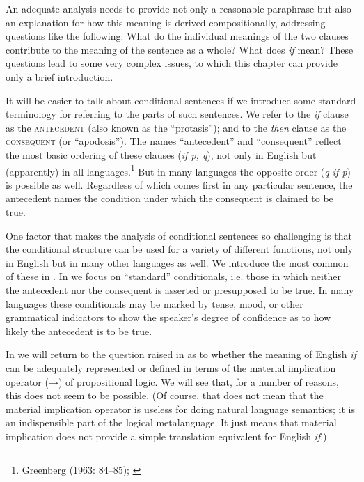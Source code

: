 An adequate analysis needs to provide not only a reasonable paraphrase but also an explanation for how this meaning is derived compositionally, addressing questions like the following: What do the individual meanings of the two clauses contribute to the meaning of the sentence as a whole? What does \textit{if} mean? These questions lead to some very complex issues, to which this chapter can provide only a brief introduction.



It will be easier to talk about conditional sentences if we introduce some standard terminology for referring to the parts of such sentences. We refer to the \textit{if} clause as the \textsc{antecedent} (also known as the “protasis”); and to the \textit{then} clause as the \textsc{consequent} (or “apodosis”). The names “antecedent” and “consequent” reflect the most basic ordering of these clauses (\textit{if p, q}), not only in English but (apparently) in all languages.\footnote{Greenberg (1963: 84–85); \citet[83]{Comrie1986}} But in many languages the opposite order (\textit{q if p}) is possible as well. Regardless of which comes first in any particular sentence, the antecedent names the condition under which the consequent is claimed to be true.



One factor that makes the analysis of conditional sentences so challenging is that the conditional structure can be used for a variety of different functions, not only in English but in many other languages as well. We introduce the most common of these in . In  we focus on “standard” conditionals, i.e. those in which neither the antecedent nor the consequent is asserted or presupposed to be true. In many languages these conditionals may be marked by tense, mood, or other grammatical indicators to show the speaker’s degree of confidence as to how likely the antecedent is to be true.



In  we will return to the question raised in  as to whether the meaning of English \textit{if} can be adequately represented or defined in terms of the material implication operator (→) of propositional logic. We will see that, for a number of reasons, this does not seem to be possible. (Of course, that does not mean that the material implication operator is useless for doing natural language semantics; it is an indispensible part of the logical metalanguage. It just means that material implication does not provide a simple translation equivalent for English \textit{if}.)



